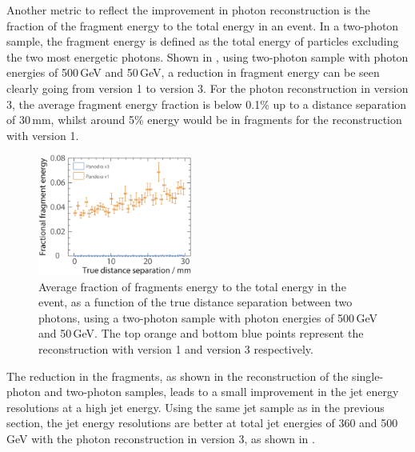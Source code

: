 Another metric to reflect the improvement in photon reconstruction is the fraction of the fragment energy to the total energy in an event. In a two-photon sample, the fragment energy is defined as the total energy of particles excluding the two most energetic photons. Shown in , using two-photon sample with photon energies of  500\,GeV and 50\,GeV, a reduction in fragment energy can be seen clearly going from \pandora version 1 to version 3. For the photon reconstruction in \pandora version 3, the average fragment energy fraction is below 0.1\% up to a distance separation of  30\,mm, whilst around 5\% energy would be in fragments for the reconstruction with \pandora version 1.
\begin{figure}[tbph]
\centering
\includegraphics[width=0.45\textwidth]{photon/DoubleCompareFragEnergy4}
\caption[Average fraction fragments energy to the total energy, as a function of the MC distance separation]
{Average fraction of fragments energy to the total energy  in the event, as a function of the true distance separation between two photons, using a two-photon sample with photon energies of  500\,GeV and 50\,GeV. The top orange and bottom blue points represent the reconstruction with \pandora version 1 and version 3 respectively. }
\label{fig:photonDoubleFragEnergy}
\end{figure}



The reduction in the fragments, as shown in the reconstruction of the single-photon and two-photon samples, leads to a small improvement in the jet energy resolutions at a high jet energy. Using the same jet sample as in the previous section, the jet energy resolutions are better at total jet energies of 360 and 500\,GeV with the  photon reconstruction in \pandora version 3, as shown in .




